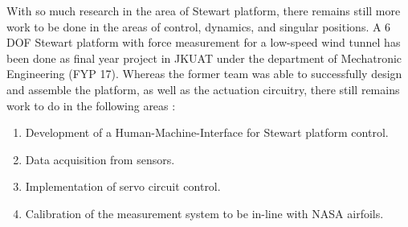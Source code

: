 With so much research in the area of Stewart platform, there remains still more work to be done in the areas of control, dynamics, and singular positions. A 6 DOF Stewart platform with force measurement for a low-speed wind tunnel has been done as final year project in JKUAT under the department of Mechatronic Engineering (FYP 17). Whereas the former team was able to successfully design and assemble the platform, as well as the actuation circuitry, there still remains work to do in the following areas \cite{caleb}:
\begin{enumerate}
\item Development of a Human-Machine-Interface for Stewart platform control.
\item Data acquisition from sensors.
\item Implementation of servo circuit control.
\item Calibration of the measurement system to be in-line with NASA airfoils.
\end{enumerate}
